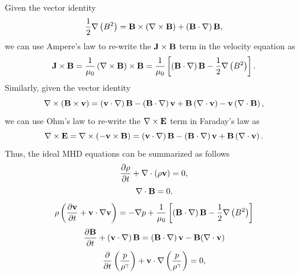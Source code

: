 \documentclass[oneside,a4paper,11pt]{report}
\begin{document}
Given the vector identity
\begin{equation}
    \frac{1}{2} \nabla \left ( B^2 \right ) = \mathbf{B} \times \left (\nabla \times \mathbf{B} \right ) + \left ( \mathbf{B} \cdot \nabla \right ) \mathbf{B},
\end{equation}
we can use Ampere's law to re-write the $\mathbf{J} \times \mathbf{B}$ term in the velocity equation as
\begin{equation}
    \mathbf{J} \times \mathbf{B} = \frac{1}{\mu_0} \left ( \nabla \times \mathbf{B} \right ) \times \mathbf{B} = \frac{1}{\mu_0} \left [ \left ( \mathbf{B} \cdot \nabla \right ) \mathbf{B} - \frac{1}{2} \nabla \left ( B^2 \right ) \right ].
\end{equation}
Similarly, given the vector identity
\begin{equation}
    \nabla \times \left ( \mathbf{B} \times \mathbf{v} \right ) = \left (\mathbf{v} \cdot \nabla \right ) \mathbf{B} - \left ( \mathbf{B} \cdot \nabla \right ) \mathbf{v} + \mathbf{B} \left ( \nabla \cdot \mathbf{v} \right ) - \mathbf{v} \left ( \nabla \cdot \mathbf{B} \right ),
\end{equation}
we can use Ohm's law to re-write the $\nabla \times \mathbf{E}$ term in Faraday's law as
\begin{equation}
    \nabla \times \mathbf{E} = \nabla \times (-\mathbf{v} \times \mathbf{B}) = \left (\mathbf{v} \cdot \nabla \right ) \mathbf{B} - \left ( \mathbf{B} \cdot \nabla \right ) \mathbf{v} + \mathbf{B} \left ( \nabla \cdot \mathbf{v} \right ).
\end{equation}
Thus, the ideal MHD equations can be summarized as follows
\begin{equation}
    \frac{\partial \rho}{\partial t} + \nabla \cdot (\rho \mathbf{v}) = 0,
\end{equation}
\begin{equation}
    \nabla \cdot \mathbf{B} = 0.
    \end{equation}
\begin{equation}
    \rho \left (\frac{\partial \mathbf{v}}{\partial t} + \mathbf{v} \cdot \nabla \mathbf{v} \right ) = - \nabla p  + \frac{1}{\mu_0} \left [ \left ( \mathbf{B} \cdot \nabla \right ) \mathbf{B} - \frac{1}{2} \nabla \left ( B^2 \right ) \right ]
\end{equation}
\begin{equation}
    \frac{\partial \mathbf{B}}{\partial t} + \left ( \mathbf{v} \cdot \nabla \right ) \mathbf{B} = \left ( \mathbf{B} \cdot \nabla \right ) \mathbf{v} - \mathbf{B} (\nabla \cdot \mathbf{v})
\end{equation}
\begin{equation}
    \frac{\partial}{\partial t} \left ( \frac{p}{\rho^\gamma} \right ) + \mathbf{v} \cdot \nabla \left (\frac{p}{\rho^\gamma} \right ) = 0,
\end{equation}
\end{document}
